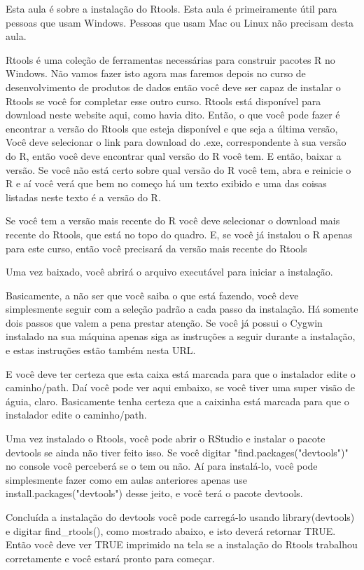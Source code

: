 Esta aula é sobre a instalação do Rtools. Esta aula é primeiramente útil para pessoas que usam Windows. Pessoas que usam Mac ou Linux não precisam desta aula. 

Rtools é uma coleção de ferramentas necessárias para construir pacotes R no Windows. Não vamos fazer isto agora mas faremos depois no curso de desenvolvimento de produtos de dados então você deve ser capaz de instalar o Rtools se você for completar esse outro curso. Rtools está disponível para download neste website aqui, como havia dito. Então, o que você pode fazer é encontrar a versão do Rtools que esteja disponível e que seja a última versão, Você deve selecionar o link para download do .exe, correspondente à sua versão do R, então você deve encontrar qual versão do R você tem. E então, baixar a versão. Se você não está certo sobre qual versão do R você tem, abra e reinicie o R e aí você verá  que bem no começo há um texto exibido e uma das coisas listadas neste texto é a versão do R. 

Se você tem a versão mais recente do R você deve selecionar o download mais recente do Rtools, que está no topo do quadro. E, se você já instalou o R apenas para este curso, então você precisará da versão mais recente do Rtools 

Uma vez baixado, você abrirá o arquivo executável para iniciar a instalação. 

Basicamente, a não ser que você saiba o que está fazendo, você deve simplesmente seguir com a seleção padrão a cada passo da instalação. Há somente dois passos que valem a pena prestar atenção. Se você já possui o Cygwin instalado na sua máquina apenas siga as instruções a seguir durante a instalação, e estas instruções estão também nesta URL. 

E você deve ter certeza que esta caixa está marcada para que o instalador edite o caminho/path. Daí você pode ver aqui embaixo, se você tiver uma super visão de águia, claro. Basicamente tenha certeza que a caixinha está marcada para que o instalador edite o caminho/path. 

Uma vez instalado o Rtools, você pode abrir o RStudio e instalar o pacote devtools se ainda não tiver feito isso. Se você digitar "find.packages("devtools")" no console você perceberá se o tem ou não. Aí para instalá-lo, você pode simplesmente fazer como em aulas anteriores apenas use install.packages("devtools") desse jeito, e você terá o pacote devtools. 

Concluída a instalação do devtools você pode carregá-lo usando library(devtools) e digitar find\_rtools(), como mostrado abaixo, e isto deverá retornar TRUE. Então você deve ver TRUE imprimido na tela se a instalação do Rtools trabalhou corretamente e você estará pronto para começar. 


